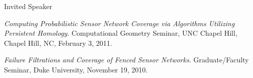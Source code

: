 \documentclass{resume} %
\begin{document}
\begin{rSection}{Invited Speaker}
\begin{etaremune}
\item\emph{Computing Probabilistic Sensor Network Coverage via Algorithms Utilizing Persistent Homology}. Computational Geometry Seminar, UNC Chapel Hill, Chapel Hill, NC, February 3, 2011. 

\item\emph{Failure Filtrations and Coverage of Fenced Sensor Networks}. Graduate/Faculty Seminar, Duke University, November 19, 2010. 

\end{etaremune}
\end{rSection}


%

\newpage
\end{document}
